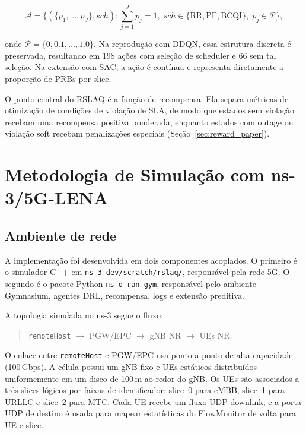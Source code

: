 \documentclass[10pt,a4paper]{IEEEtran}
\begin{document}
\begin{equation}
\mathcal{A} = \big\{(\{p_1,\dots,p_J\}, sch) :
       \sum_{j=1}^{J} p_j = 1,\;
       sch \in \{\text{RR}, \text{PF}, \text{BCQI}\},\;
       p_j \in \mathcal{P}\big\},
\label{eq:action_set}
\end{equation}

onde $\mathcal{P} = \{0, 0.1, \dots, 1.0\}$. Na
reprodu\c{c}\~{a}o com DDQN, essa estrutura discreta
\'{e} preservada, resultando em 198 a\c{c}\~{o}es com
sele\c{c}\~{a}o de scheduler e 66 sem tal sele\c{c}\~{a}o. Na
extens\~{a}o com SAC, a a\c{c}\~{a}o \'{e} cont\'{i}nua e
representa diretamente a propor\c{c}\~{a}o de PRBs por slice.

O ponto central do RSLAQ \'{e} a fun\c{c}\~{a}o de recompensa.
Ela separa m\'{e}tricas de otimiza\c{c}\~{a}o de condi\c{c}\~{o}es
de viola\c{c}\~{a}o de SLA, de modo que estados sem
viola\c{c}\~{a}o recebam uma recompensa positiva ponderada,
enquanto estados com outage ou viola\c{c}\~{a}o soft recebam
penaliza\c{c}\~{o}es especiais (Se\c{c}\~{a}o~\ref{sec:reward_paper}).

\section{Metodologia de Simula\c{c}\~{a}o com ns-3/5G-LENA}
\label{sec:metodologia}

\subsection{Ambiente de rede}

A implementa\c{c}\~{a}o foi desenvolvida em dois componentes
acoplados. O primeiro \'{e} o simulador C++ em
\texttt{ns-3-dev/scratch/rslaq/}, respons\'{a}vel pela rede 5G.
O segundo \'{e} o pacote Python \texttt{ns-o-ran-gym},
respons\'{a}vel pelo ambiente Gymnasium, agentes DRL,
recompensa, logs e extens\~{a}o preditiva.

A topologia simulada no ns-3 segue o fluxo:

\begin{quote}
  \texttt{remoteHost} $\rightarrow$ PGW/EPC $\rightarrow$
  gNB NR $\rightarrow$ UEs NR.
\end{quote}

O enlace entre \texttt{remoteHost} e PGW/EPC usa ponto-a-ponto
de alta capacidade (100\,Gbps). A c\'{e}lula possui um gNB fixo
e UEs est\'{a}ticos distribu\'{i}dos uniformemente em um disco
de 100\,m ao redor do gNB. Os UEs s\~{a}o associados a
tr\^{e}s slices l\'{o}gicos por faixas de identificador: slice~0
para eMBB, slice~1 para URLLC e slice~2 para MTC. Cada UE
recebe um fluxo UDP downlink, e a porta UDP de destino \'{e}
usada para mapear estat\'{i}sticas do FlowMonitor de volta para
UE e slice.
\end{document}
